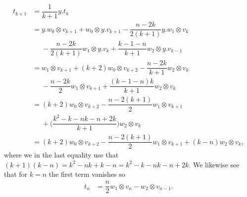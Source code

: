 \begin{align*}
  t_{k+1} &= \dfrac{1}{k+1}y.t_k \\
         &= y.w_0\otimes v_{k+1} + w_0\otimes y.v_{k+1} - \dfrac{n-2k}{2(k+1)}y.w_1\otimes v_k \\
          &\phantom{{}={}}{} - \dfrac{n-2k}{2(k+1)}w_1\otimes y.v_k + \dfrac{k-1-n}{k+1}w_2\otimes y.v_{k-1} \\
          &= w_1\otimes v_{k+1} + (k+2)w_0\otimes v_{k+2} - \dfrac{n-2k}{k+1}w_2\otimes v_k \\
          &\phantom{{}={}}{} - \dfrac{n-2k}{2}w_1\otimes v_{k+1} + \dfrac{(k-1-n)k}{k+1}w_2\otimes v_k \\
          &= (k+2)w_0\otimes v_{k+2} - \dfrac{n-2(k+1)}{2}w_1\otimes v_{k+1} \\
          &\phantom{{}={}}{} + \biggl( \dfrac{k^2-k-nk-n+2k}{k+1} \biggr) w_2\otimes v_k \\
  &= (k+2)w_0\otimes v_{k+2} - \dfrac{n-2(k+1)}{2}w_1\otimes v_{k+1} + (k-n)w_2\otimes v_k,
\end{align*}
where we in the last equality use that $(k+1)(k-n)=k^2-nk+k-n = k^2-k-nk-n+2k$. We likewise see that for $k=n$ the first term vanishes so
\begin{align*}
  t_n &= \dfrac{n}{2}w_1\otimes v_n - w_2\otimes v_{n-1}.
\end{align*}
